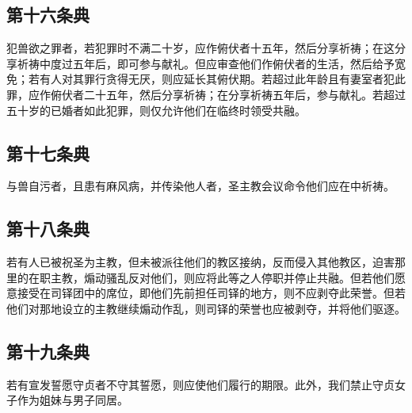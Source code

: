 \subsection{第十六条典}

犯兽欲之罪者，若犯罪时不满二十岁，应作俯伏者十五年，然后分享祈祷；在这分享祈祷中度过五年后，即可参与献礼。但应审查他们作俯伏者的生活，然后给予宽免；若有人对其罪行贪得无厌，则应延长其俯伏期。若超过此年龄且有妻室者犯此罪，应作俯伏者二十五年，然后分享祈祷；在分享祈祷五年后，参与献礼。若超过五十岁的已婚者如此犯罪，则仅允许他们在临终时领受共融。\par


\subsection{第十七条典}

与兽自污者，且患有麻风病，并传染他人者，圣主教会议命令他们应在中祈祷。\par


\subsection{第十八条典}

若有人已被祝圣为主教，但未被派往他们的教区接纳，反而侵入其他教区，迫害那里的在职主教，煽动骚乱反对他们，则应将此等之人停职并停止共融。但若他们愿意接受在司铎团中的席位，即他们先前担任司铎的地方，则不应剥夺此荣誉。但若他们对那地设立的主教继续煽动作乱，则司铎的荣誉也应被剥夺，并将他们驱逐。\par


\subsection{第十九条典}

若有宣发誓愿守贞者不守其誓愿，则应使他们履行的期限。此外，我们禁止守贞女子作为姐妹与男子同居。\par


